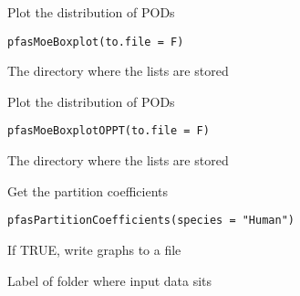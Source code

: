 \documentclass[a4paper]{book}
\begin{document}
%
\begin{Description}\relax
Plot the distribution of PODs
\end{Description}
%
\begin{Usage}
\begin{verbatim}
pfasMoeBoxplot(to.file = F)
\end{verbatim}
\end{Usage}
%
\begin{Arguments}
\begin{ldescription}
\item[\code{dir}] The directory where the lists are stored
\end{ldescription}
\end{Arguments}
%
\begin{Description}\relax
Plot the distribution of PODs
\end{Description}
%
\begin{Usage}
\begin{verbatim}
pfasMoeBoxplotOPPT(to.file = F)
\end{verbatim}
\end{Usage}
%
\begin{Arguments}
\begin{ldescription}
\item[\code{dir}] The directory where the lists are stored
\end{ldescription}
\end{Arguments}
%
\begin{Description}\relax
Get the partition coefficients
\end{Description}
%
\begin{Usage}
\begin{verbatim}
pfasPartitionCoefficients(species = "Human")
\end{verbatim}
\end{Usage}
%
\begin{Arguments}
\begin{ldescription}
\item[\code{to.file}] If TRUE, write graphs to a file

\item[\code{data.version}] Label of folder where input data sits
\end{ldescription}
\end{Arguments}
\end{document}
